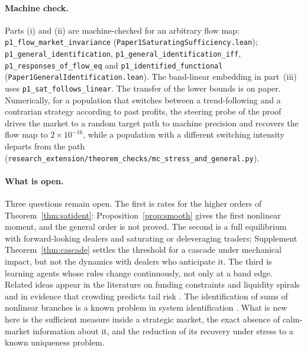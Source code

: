 \paragraph{Machine check.} Parts (i) and (ii) are machine-checked for an arbitrary flow map: \texttt{p1\_flow\_market\_invariance} (\nolinkurl{Paper1SaturatingSufficiency.lean}); \texttt{p1\_general\_identification}, \texttt{p1\_general\_identification\_iff}, \texttt{p1\_responses\_of\_flow\_eq} and \texttt{p1\_identified\_functional} (\nolinkurl{Paper1GeneralIdentification.lean}). The band-linear embedding in part~(iii) uses \texttt{p1\_sat\_follows\_linear}. The transfer of the lower bounds is on paper. Numerically, for a population that switches between a trend-following and a contrarian strategy according to past profits, the steering probe of the proof drives the market to a random target path to machine precision and recovers the flow map to $2\times10^{-16}$, while a population with a different switching intensity departs from the path (\nolinkurl{research_extension/theorem_checks/mc_stress_and_general.py}).

\paragraph{What is open.} Three questions remain open. The first is rates for the higher orders of Theorem~\ref{thm:satident}: Proposition~\ref{prop:smooth} gives the first nonlinear moment, and the general order is not proved. The second is a full equilibrium with forward-looking dealers and saturating or deleveraging traders; Supplement Theorem~\ref{thm:cascade} settles the threshold for a cascade under mechanical impact, but not the dynamics with dealers who anticipate it. The third is learning agents whose rules change continuously, not only at a band edge. Related ideas appear in the literature on funding constraints and liquidity spirals \citep{brunnermeier2009} and in evidence that crowding predicts tail risk \citep{barroso2022}. The identification of sums of nonlinear branches is a known problem in system identification \citep{dreesen2017}. What is new here is the sufficient measure inside a strategic market, the exact absence of calm-market information about it, and the reduction of its recovery under stress to a known uniqueness problem.
